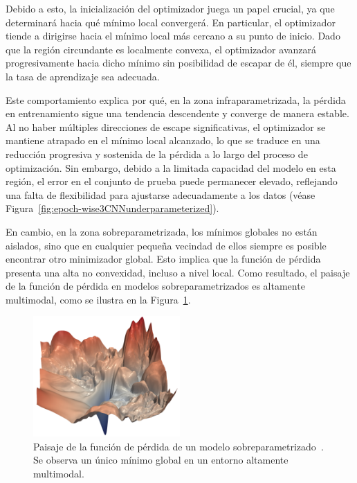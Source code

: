 Debido a esto, la inicialización del optimizador juega un papel crucial, ya que determinará hacia qué mínimo local convergerá. En particular, el optimizador tiende a dirigirse hacia el mínimo local más cercano a su punto de inicio. Dado que la región circundante es localmente convexa, el optimizador avanzará progresivamente hacia dicho mínimo sin posibilidad de escapar de él, siempre que la tasa de aprendizaje sea adecuada.\newline

Este comportamiento explica por qué, en la zona infraparametrizada, la pérdida en entrenamiento sigue una tendencia descendente y converge de manera estable. Al no haber múltiples direcciones de escape significativas, el optimizador se mantiene atrapado en el mínimo local alcanzado, lo que se traduce en una reducción progresiva y sostenida de la pérdida a lo largo del proceso de optimización. Sin embargo, debido a la limitada capacidad del modelo en esta región, el error en el conjunto de prueba puede permanecer elevado, reflejando una falta de flexibilidad para ajustarse adecuadamente a los datos (véase Figura~\ref{fig:epoch-wise3CNNunderparameterized}).\newline

En cambio, en la zona sobreparametrizada, los mínimos globales no están aislados, sino que en cualquier pequeña vecindad de ellos siempre es posible encontrar otro minimizador global. Esto implica que la función de pérdida presenta una alta no convexidad, incluso a nivel local. Como resultado, el paisaje de la función de pérdida en modelos sobreparametrizados es altamente multimodal, como se ilustra en la Figura~\ref{fig:landscapemultimodal}.\newline

\begin{figure}[h]
    \centering
    \includegraphics[width=0.5\textwidth]{img/experiments/landscapemultimodal.png}
    \caption[Paisaje de la función de pérdida de un modelo sobreparametrizado~\cite{Li2018}.]{Paisaje de la función de pérdida de un modelo sobreparametrizado~\cite{Li2018}. Se observa un único mínimo global en un entorno altamente multimodal.}\label{fig:landscapemultimodal}
\end{figure}

